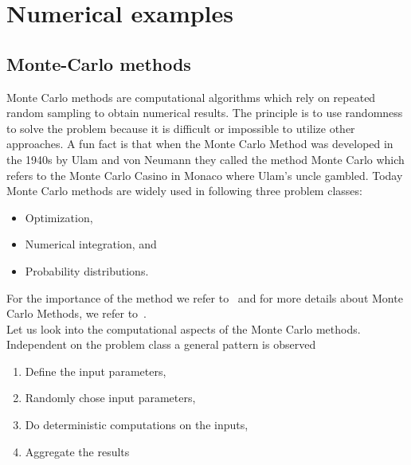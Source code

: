 \documentclass[11pt,fleqn]{book} %
\begin{document}
\newpage
\theendnotes


\part{Numerical examples}
\label{part:numerical:examples}

\chapter{Monte-Carlo methods}
\label{sec:monte:carlo}
Monte Carlo methods are computational algorithms which rely on repeated random sampling to obtain numerical results. The principle is to use randomness to solve the problem because it is difficult or impossible to utilize other approaches. A fun fact is that when the Monte Carlo Method was developed in the 1940s by Ulam and von Neumann they called the method Monte Carlo which refers to the Monte Carlo Casino in Monaco where Ulam's uncle gambled. Today Monte Carlo methods are widely used in following three problem classes:
\begin{itemize}
\item Optimization,
\item Numerical integration, and
\item Probability distributions.
\end{itemize}
For the importance of the method we refer to~\cite{kroese2014monte} and for more details about Monte Carlo Methods, we refer to~\cite{shonkwiler2009explorations}.\\

Let us look into the computational aspects of the Monte Carlo methods. Independent on the problem class a general pattern is observed
\begin{enumerate}
\item Define the input parameters,
\item Randomly chose input parameters,
\item Do deterministic computations on the inputs,
\item Aggregate the results
\end{enumerate}
\end{document}
